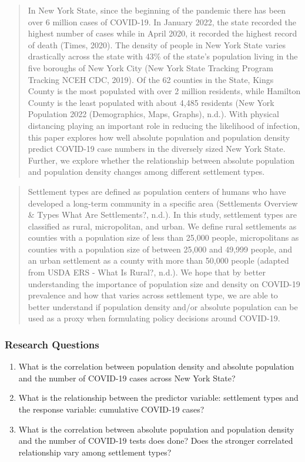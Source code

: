 \documentclass[
  12pt,
]{article}
\begin{document}
\begin{quote}
In New York State, since the beginning of the pandemic there has been
over 6 million cases of COVID-19. In January 2022, the state recorded
the highest number of cases while in April 2020, it recorded the highest
record of death (Times, 2020). The density of people in New York State
varies drastically across the state with 43\% of the state's population
living in the five boroughs of New York City (New York State Tracking
Program \textbar{} Tracking \textbar{} NCEH \textbar{} CDC, 2019). Of
the 62 counties in the State, Kings County is the most populated with
over 2 million residents, while Hamilton County is the least populated
with about 4,485 residents (New York Population 2022 (Demographics,
Maps, Graphs), n.d.). With physical distancing playing an important role
in reducing the likelihood of infection, this paper explores how well
absolute population and population density predict COVID-19 case numbers
in the diversely sized New York State. Further, we explore whether the
relationship between absolute population and population density changes
among different settlement types.
\end{quote}

\begin{quote}
Settlement types are defined as population centers of humans who have
developed a long-term community in a specific area (Settlements Overview
\& Types \textbar{} What Are Settlements?, n.d.). In this study,
settlement types are classified as rural, micropolitan, and urban. We
define rural settlements as counties with a population size of less than
25,000 people, micropolitans as counties with a population size of
between 25,000 and 49,999 people, and an urban settlement as a county
with more than 50,000 people (adapted from USDA ERS - What Is Rural?,
n.d.). We hope that by better understanding the importance of population
size and density on COVID-19 prevalence and how that varies across
settlement type, we are able to better understand if population density
and/or absolute population can be used as a proxy when formulating
policy decisions around COVID-19.
\end{quote}

\hypertarget{research-questions}{%
\subsubsection{Research Questions}\label{research-questions}}

\begin{enumerate}
\def\labelenumi{\arabic{enumi}.}
\item
  What is the correlation between population density and absolute
  population and the number of COVID-19 cases across New York State?
\item
  What is the relationship between the predictor variable: settlement
  types and the response variable: cumulative COVID-19 cases?
\item
  What is the correlation between absolute population and population
  density and the number of COVID-19 tests does done? Does the stronger
  correlated relationship vary among settlement types?
\end{enumerate}
\end{document}
